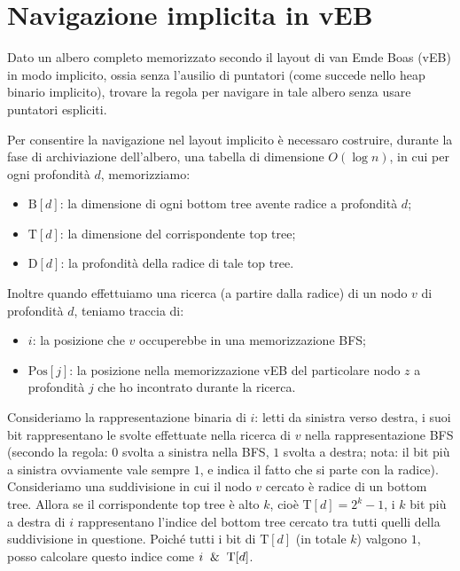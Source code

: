 \chapter{Navigazione implicita in vEB}

\begin{problem*}
    Dato un albero completo memorizzato secondo il layout di van Emde Boas (vEB) in
    modo implicito, ossia senza l'ausilio di puntatori (come succede nello heap binario
    implicito), trovare la regola per navigare in tale albero senza usare puntatori
    espliciti.
\end{problem*}
Per consentire la navigazione nel layout implicito è necessaro costruire, durante la fase di archiviazione dell'albero, una tabella di dimensione $O(\log n)$, in cui per ogni profondità $d$, memorizziamo:
\begin{itemize}
\item $\mbox{B}[d]$: la dimensione di ogni bottom tree avente radice a profondità $d$;
\item $\mbox{T}[d]$: la dimensione del corrispondente top tree;
\item $\mbox{D}[d]$: la profondità della radice di tale top tree.
\end{itemize}
Inoltre quando effettuiamo una ricerca (a partire dalla radice) di un nodo $v$ di profondità $d$, teniamo traccia di:
\begin{itemize}
\item $i$: la posizione che $v$ occuperebbe in una memorizzazione BFS;
\item $\mbox{Pos}[j]$: la posizione nella memorizzazione vEB del particolare nodo $z$ a profondità $j$ che ho incontrato durante la ricerca.
\end{itemize}
Consideriamo la rappresentazione binaria di $i$: letti da sinistra verso destra, i suoi bit rappresentano le svolte effettuate nella ricerca di $v$ nella rappresentazione BFS (secondo la regola: $0$ svolta a sinistra nella BFS, $1$ svolta a destra; nota: il bit più a sinistra ovviamente vale sempre $1$, e indica il fatto che si parte con la radice).\newline
Consideriamo una suddivisione in cui il nodo $v$ cercato è radice di un bottom tree. Allora se il corrispondente top tree è alto $k$, cioè $\mbox{T}[d]=2^k-1$, i $k$ bit più a destra di $i$ rappresentano l'indice del bottom tree cercato tra tutti quelli della suddivisione in questione. Poiché tutti i bit di $\mbox{T}[d]$ (in totale $k$) valgono $1$, posso calcolare questo indice come $i \And \mbox{T}[d]$. \newline
